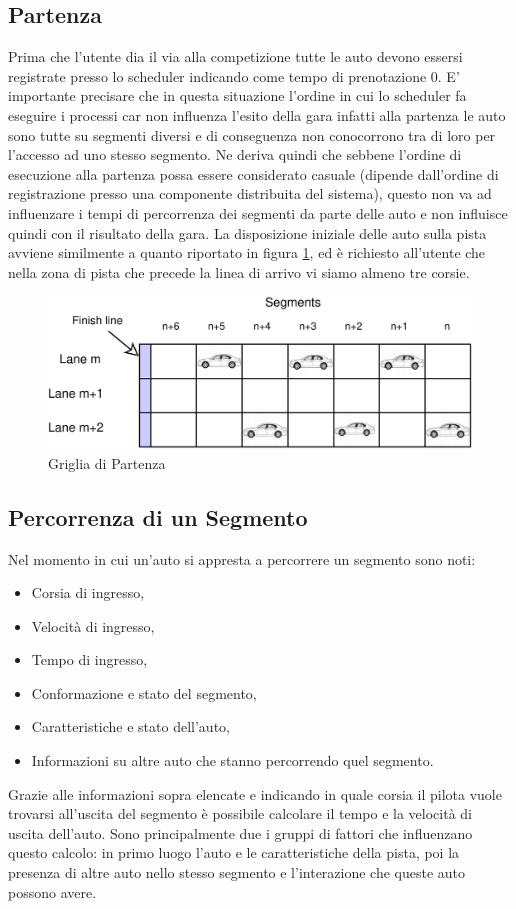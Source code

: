 \documentclass[11pt,a4paper]{report}
\begin{document}
\subsection{Partenza}
Prima che l'utente dia il via alla competizione tutte le auto devono essersi registrate presso lo scheduler indicando come tempo di prenotazione 0.
E' importante precisare che in questa situazione l'ordine in cui lo scheduler fa eseguire i processi car non influenza l'esito della gara infatti alla partenza le auto sono tutte su segmenti diversi e di conseguenza non conocorrono tra di loro per l'accesso ad uno stesso segmento. Ne deriva quindi che sebbene l'ordine di esecuzione alla partenza possa essere considerato casuale (dipende dall'ordine di registrazione presso una componente distribuita del sistema), questo non va ad influenzare i tempi di percorrenza dei segmenti da parte delle auto e non influisce quindi con il risultato della gara.
La disposizione iniziale delle auto sulla pista avviene similmente a quanto riportato in figura \ref{fig:startGrid}, ed è richiesto all'utente che nella zona di pista che precede la linea di arrivo vi siamo almeno tre corsie.
\begin{figure}
\includegraphics[width=\textwidth]{diagrammi/StartGrid}
\caption{Griglia di Partenza}
\label{fig:startGrid}
\end{figure}
\subsection{Percorrenza di un Segmento}
Nel momento in cui un'auto si appresta a percorrere un segmento sono noti:
\begin{itemize}
\item Corsia di ingresso,
\item Velocità di ingresso,
\item Tempo di ingresso,
\item Conformazione e stato del segmento,
\item Caratteristiche e stato dell'auto,
\item Informazioni su altre auto che stanno percorrendo quel segmento.
\end{itemize}
Grazie alle informazioni sopra elencate e indicando in quale corsia il pilota vuole trovarsi all'uscita del segmento è possibile calcolare il tempo e la velocità di uscita dell'auto. Sono principalmente due i gruppi di fattori che influenzano questo calcolo: in primo luogo l'auto e le caratteristiche della pista, poi la presenza di altre auto nello stesso segmento e l'interazione che queste auto possono avere.
\end{document}
